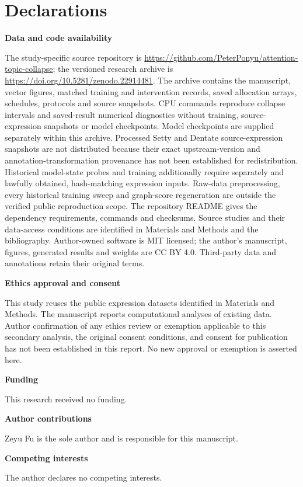 \documentclass[11pt]{article}
\begin{document}
\section{Declarations}
\noindent\textbf{Data and code availability}\par\nobreak
The study-specific source repository is \url{https://github.com/PeterPonyu/attention-topic-collapse}; the versioned research archive is \url{https://doi.org/10.5281/zenodo.22914481}. The archive contains the manuscript, vector figures, matched training and intervention records, saved allocation arrays, schedules, protocols and source snapshots. CPU commands reproduce collapse intervals and saved-result numerical diagnostics without training, source-expression snapshots or model checkpoints. Model checkpoints are supplied separately within this archive. Processed Setty and Dentate source-expression snapshots are not distributed because their exact upstream-version and annotation-transformation provenance has not been established for redistribution. Historical model-state probes and training additionally require separately and lawfully obtained, hash-matching expression inputs. Raw-data preprocessing, every historical training sweep and graph-score regeneration are outside the verified public reproduction scope. The repository README gives the dependency requirements, commands and checksums. Source studies and their data-access conditions are identified in Materials and Methods and the bibliography. Author-owned software is MIT licensed; the author's manuscript, figures, generated results and weights are CC BY 4.0. Third-party data and annotations retain their original terms.

\noindent\textbf{Ethics approval and consent}\par\nobreak

This study reuses the public expression datasets identified in Materials and Methods. The manuscript reports computational analyses of existing data. Author confirmation of any ethics review or exemption applicable to this secondary analysis, the original consent conditions, and consent for publication has not been established in this report. No new approval or exemption is asserted here.

\noindent\textbf{Funding}\par\nobreak

This research received no funding.

\noindent\textbf{Author contributions}\par\nobreak

Zeyu Fu is the sole author and is responsible for this manuscript.

\noindent\textbf{Competing interests}\par\nobreak
The author declares no competing interests.



\end{document}
